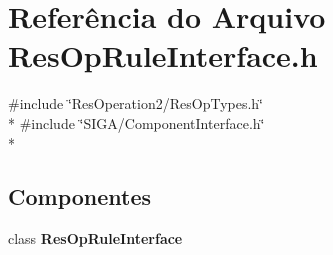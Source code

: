 \section{Referência do Arquivo Res\+Op\+Rule\+Interface.\+h}
\label{_2_rule_2_res_op_rule_interface_8h}
{\ttfamily \#include \char`\"{}Res\+Operation2/\+Res\+Op\+Types.\+h\char`\"{}}\\*
{\ttfamily \#include \char`\"{}S\+I\+G\+A/\+Component\+Interface.\+h\char`\"{}}\\*
\subsection*{Componentes}
\begin{DoxyCompactItemize}
\item 
class {\bf Res\+Op\+Rule\+Interface}
\end{DoxyCompactItemize}
